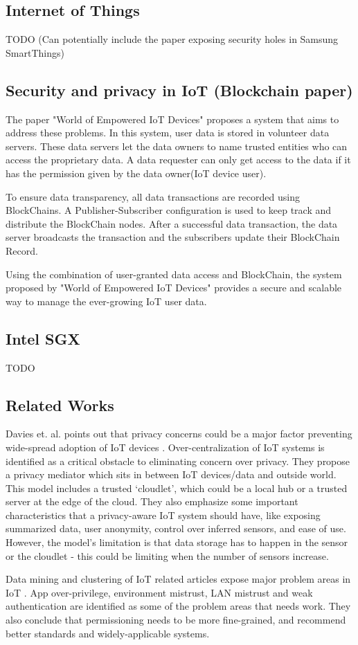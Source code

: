 \subsection{Internet of Things}
TODO
(Can potentially include the paper exposing security holes in Samsung SmartThings)

\subsection{Security and privacy in IoT (Blockchain paper)}
The paper "World of Empowered IoT Devices" proposes a system that aims to address these problems. In this system, user data is stored in volunteer data servers. These data servers let the data owners to name trusted entities who can access the proprietary data. A data requester can only get access to the data if it has the permission given by the data owner(IoT device user). 

To ensure data transparency, all data transactions are recorded using BlockChains. A Publisher-Subscriber configuration is used to keep track and distribute the BlockChain nodes. After a successful data transaction, the data server broadcasts the transaction and the subscribers update their BlockChain Record.

Using the combination of user-granted data access and BlockChain, the system proposed by "World of Empowered IoT Devices" provides a secure and scalable way to manage the ever-growing IoT user data.

\subsection{Intel SGX}
TODO

\subsection{Related Works}
Davies et. al. points out that privacy concerns could be a major factor preventing wide-spread adoption of IoT devices \cite{davies}. Over-centralization of IoT systems is identified as a critical obstacle to eliminating concern over privacy. They propose a privacy mediator which sits in between IoT devices/data and outside world. This model includes a trusted `cloudlet', which could be a local hub or a trusted server at the edge of the cloud. They also emphasize some important characteristics that a privacy-aware IoT system should have, like exposing summarized data, user anonymity, control over inferred sensors, and ease of use. However, the model's limitation is that data storage has to happen in the sensor or the cloudlet - this could be limiting when the number of sensors increase.

Data mining and clustering of IoT related articles expose major problem areas in IoT \cite{zhang}. App over-privilege, environment mistrust, LAN mistrust and weak authentication are identified as some of the problem areas that needs work. They also conclude that permissioning needs to be more fine-grained, and recommend better standards and widely-applicable systems.
